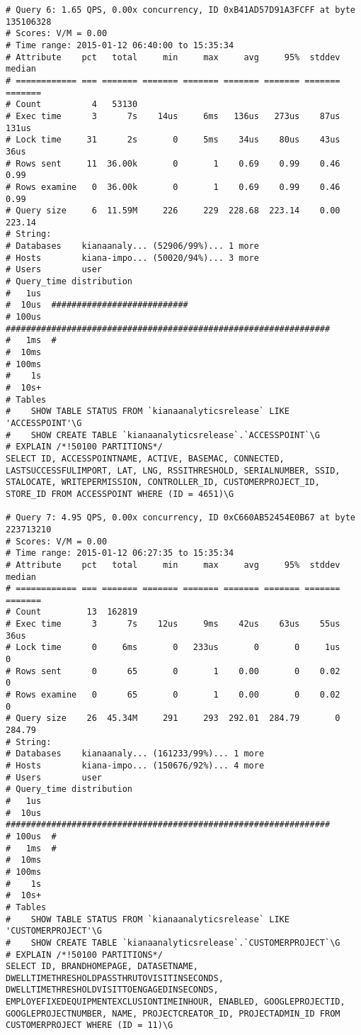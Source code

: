 \begin{appendix}
\begin{footnotesize}
\begin{verbatim}
# Query 6: 1.65 QPS, 0.00x concurrency, ID 0xB41AD57D91A3FCFF at byte 135106328
# Scores: V/M = 0.00
# Time range: 2015-01-12 06:40:00 to 15:35:34
# Attribute    pct   total     min     max     avg     95%  stddev  median
# ============ === ======= ======= ======= ======= ======= ======= =======
# Count          4   53130
# Exec time      3      7s    14us     6ms   136us   273us    87us   131us
# Lock time     31      2s       0     5ms    34us    80us    43us    36us
# Rows sent     11  36.00k       0       1    0.69    0.99    0.46    0.99
# Rows examine   0  36.00k       0       1    0.69    0.99    0.46    0.99
# Query size     6  11.59M     226     229  228.68  223.14    0.00  223.14
# String:
# Databases    kianaanaly... (52906/99%)... 1 more
# Hosts        kiana-impo... (50020/94%)... 3 more
# Users        user
# Query_time distribution
#   1us
#  10us  ###########################
# 100us  ################################################################
#   1ms  #
#  10ms
# 100ms
#    1s
#  10s+
# Tables
#    SHOW TABLE STATUS FROM `kianaanalyticsrelease` LIKE 'ACCESSPOINT'\G
#    SHOW CREATE TABLE `kianaanalyticsrelease`.`ACCESSPOINT`\G
# EXPLAIN /*!50100 PARTITIONS*/
SELECT ID, ACCESSPOINTNAME, ACTIVE, BASEMAC, CONNECTED, LASTSUCCESSFULIMPORT, LAT, LNG, RSSITHRESHOLD, SERIALNUMBER, SSID, STALOCATE, WRITEPERMISSION, CONTROLLER_ID, CUSTOMERPROJECT_ID, STORE_ID FROM ACCESSPOINT WHERE (ID = 4651)\G

# Query 7: 4.95 QPS, 0.00x concurrency, ID 0xC660AB52454E0B67 at byte 223713210
# Scores: V/M = 0.00
# Time range: 2015-01-12 06:27:35 to 15:35:34
# Attribute    pct   total     min     max     avg     95%  stddev  median
# ============ === ======= ======= ======= ======= ======= ======= =======
# Count         13  162819
# Exec time      3      7s    12us     9ms    42us    63us    55us    36us
# Lock time      0     6ms       0   233us       0       0     1us       0
# Rows sent      0      65       0       1    0.00       0    0.02       0
# Rows examine   0      65       0       1    0.00       0    0.02       0
# Query size    26  45.34M     291     293  292.01  284.79       0  284.79
# String:
# Databases    kianaanaly... (161233/99%)... 1 more
# Hosts        kiana-impo... (150676/92%)... 4 more
# Users        user
# Query_time distribution
#   1us
#  10us  ################################################################
# 100us  #
#   1ms  #
#  10ms
# 100ms
#    1s
#  10s+
# Tables
#    SHOW TABLE STATUS FROM `kianaanalyticsrelease` LIKE 'CUSTOMERPROJECT'\G
#    SHOW CREATE TABLE `kianaanalyticsrelease`.`CUSTOMERPROJECT`\G
# EXPLAIN /*!50100 PARTITIONS*/
SELECT ID, BRANDHOMEPAGE, DATASETNAME, DWELLTIMETHRESHOLDPASSTHRUTOVISITINSECONDS, DWELLTIMETHRESHOLDVISITTOENGAGEDINSECONDS, EMPLOYEFIXEDEQUIPMENTEXCLUSIONTIMEINHOUR, ENABLED, GOOGLEPROJECTID, GOOGLEPROJECTNUMBER, NAME, PROJECTCREATOR_ID, PROJECTADMIN_ID FROM CUSTOMERPROJECT WHERE (ID = 11)\G


\end{verbatim}
\end{footnotesize}
\end{appendix}
